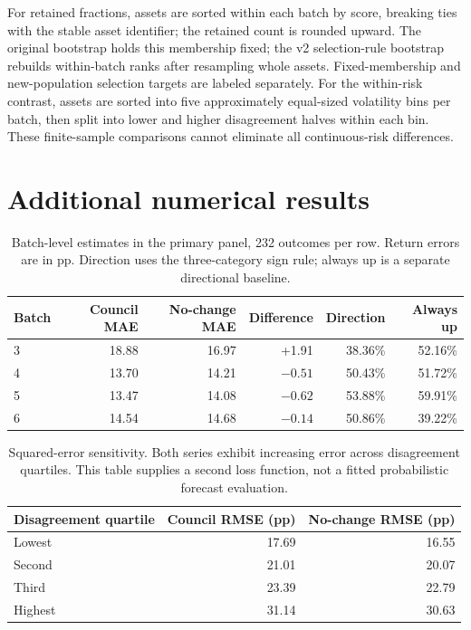 \documentclass[11pt]{article}
\begin{document}
For retained fractions, assets are sorted within each batch by score, breaking ties with the stable asset identifier; the retained count is rounded upward. The original bootstrap holds this membership fixed; the v2 selection-rule bootstrap rebuilds within-batch ranks after resampling whole assets. Fixed-membership and new-population selection targets are labeled separately. For the within-risk contrast, assets are sorted into five approximately equal-sized volatility bins per batch, then split into lower and higher disagreement halves within each bin. These finite-sample comparisons cannot eliminate all continuous-risk differences.

\section{Additional numerical results}\label{app:tables}
\begin{table}[H]
\centering\small
\begin{tabular}{lrrrrr}
\toprule
Batch & Council MAE & No-change MAE & Difference & Direction & Always up\\
\midrule
3 & 18.88 & 16.97 & +1.91 & 38.36\% & 52.16\%\\
4 & 13.70 & 14.21 & $-0.51$ & 50.43\% & 51.72\%\\
5 & 13.47 & 14.08 & $-0.62$ & 53.88\% & 59.91\%\\
6 & 14.54 & 14.68 & $-0.14$ & 50.86\% & 39.22\%\\
\bottomrule
\end{tabular}
\caption{Batch-level estimates in the primary panel, 232 outcomes per row. Return errors are in pp. Direction uses the three-category sign rule; always up is a separate directional baseline.}
\label{tab:batches}
\end{table}

\begin{table}[H]
\centering\small
\begin{tabular}{lrr}
\toprule
Disagreement quartile & Council RMSE (pp) & No-change RMSE (pp)\\
\midrule
Lowest & 17.69 & 16.55\\
Second & 21.01 & 20.07\\
Third & 23.39 & 22.79\\
Highest & 31.14 & 30.63\\
\bottomrule
\end{tabular}
\caption{Squared-error sensitivity. Both series exhibit increasing error across disagreement quartiles. This table supplies a second loss function, not a fitted probabilistic forecast evaluation.}
\end{table}
\end{document}
